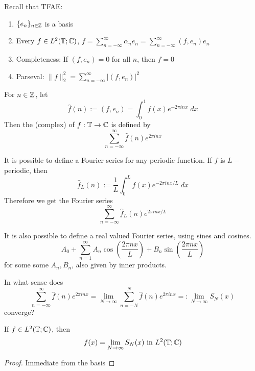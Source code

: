\begin{rem}
    Recall that TFAE:
    \begin{enumerate}
        \item $\{e_n\}_{n \in \mathbb{Z}}$ is a basis 
        \item Every $f \in L^2(\mathbb{T}; \mathbb{C})$, $f = \sum_{n = -\infty}^\infty \alpha_n e_n = \sum_{n=-\infty}^\infty (f, e_n) e_n$
        \item Completeness: If $(f, e_n) = 0$ for all $n$, then $f = 0$
        \item Parseval: $\| f \|_2^2 = \sum_{n=-\infty}^\infty |(f, e_n)|^2 $  
    \end{enumerate}
\end{rem}

\begin{defn}
    For $n \in \mathbb{Z}$, let
    \[
        \hat{f}(n) := (f, e_n) = \int_0^1 f(x) e^{-2 \pi i n x} \; dx
    \]  
    Then the (complex)  of $f : \mathbb{T} \to \mathbb{C}$ is defined by
    \[
        \sum_{n = -\infty}^\infty \hat{f}(n)e^{2 \pi i n x}
    \] 
\end{defn}

\begin{rem}
    It is possible to define a Fourier series for any periodic function. If $f$ is $L-$periodic,
    then 
    \[
        \hat{f}_L(n) := \frac{1}{L} \int_0^L f(x) e^{-2 \pi i n x / L} \; dx
    \]   
    Therefore we get the Fourier series
    \[
        \sum_{n = -\infty}^\infty \hat{f}_L(n) e^{2 \pi i n x / L}
    \] 
\end{rem}
\begin{rem}
    It is also possible to define a real valued Fourier series, using sines and cosines.
    \[
        A_0 + \sum_{n = 1}^\infty A_n \cos(\frac{2 \pi n x}{L}) + B_n \sin(\frac{2 \pi n x}{L})
    \] 
    for some some $A_n, B_n$, also given by inner products.  
\end{rem}

\begin{goal}[question]
    In what sense does 
    \[
        \sum_{n = -\infty}^\infty \hat{f}(n) e^{2 \pi i n x} = \lim_{N \to \infty} \sum_{n = -N}^N \hat{f}(n) e^{2 \pi i n x} =: \lim_{N \to \infty} S_N(x)
    \] 
    converge?
\end{goal}

\begin{prop}
    If $f \in L^2(\mathbb{T}; \mathbb{C})$, then
    \[
        f(x) = \lim_{N \to \infty} S_N(x) \text{ in } L^2(\mathbb{T}; \mathbb{C})
    \]  
\end{prop}
\begin{proof}
    Immediate from the basis \qedhere
\end{proof}

